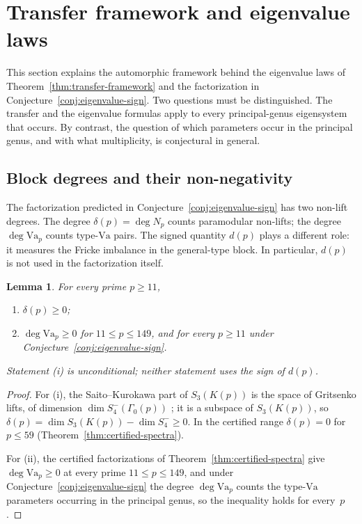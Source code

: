 \documentclass[11pt]{amsart}
\theoremstyle{plain}
\newtheorem{lemma}[theorem]{Lemma}
\theoremstyle{definition}
\newcommand{\Va}{\mathrm{Va}}
\providecommand{\Va}{\mathrm{Va}}
\begin{document}
	\section{Transfer framework and eigenvalue laws}
	\label{sec:transfer}
	
	This section explains the automorphic framework behind the eigenvalue laws
	of Theorem~\ref{thm:transfer-framework} and the factorization in
	Conjecture~\ref{conj:eigenvalue-sign}. Two questions must be
	distinguished. The transfer and the eigenvalue formulas apply to every
	principal-genus eigensystem that occurs. By contrast, the question of
	which parameters occur in the principal genus, and with what
	multiplicity, is conjectural in general.
	
	\subsection{Block degrees and their non-negativity}
	\label{ss:block-degrees}
	
	The factorization predicted in
	Conjecture~\ref{conj:eigenvalue-sign} has two non-lift degrees. The degree
	$\delta(p)=\deg N_p$ counts paramodular non-lifts; the degree
	$\deg\Va_p$ counts type-$\Va$ pairs. The signed quantity $d(p)$ plays a
	different role: it measures the Fricke imbalance in the general-type
	block. In particular, $d(p)$ is not used in the factorization itself.
	
	\begin{lemma}\label{lem:positivity}
		For every prime $p\ge11$,
		\begin{enumerate}[label=\textup{(\roman*)},leftmargin=2.3em]
			\item $\delta(p)\ge0$;
			\item $\deg\Va_p\ge0$ for $11\le p\le149$, and for every $p\ge11$
			under Conjecture~\ref{conj:eigenvalue-sign}.
		\end{enumerate}
		Statement \textup{(i)} is unconditional; neither statement uses the
		sign of $d(p)$.
	\end{lemma}
	
	\begin{proof}
		For \textup{(i)}, the Saito--Kurokawa part of $S_3(K(p))$ is the space
		of Gritsenko lifts, of dimension $\dim S_4^{-}(\Gamma_0(p))$
		\cite{Gritsenko1995,IPY2013}; it is a subspace of $S_3(K(p))$, so
		$\delta(p)=\dim S_3(K(p))-\dim S_4^{-}\ge0$. In the certified range
		$\delta(p)=0$ for $p\le59$ (Theorem~\ref{thm:certified-spectra}).
		
		For \textup{(ii)}, the certified factorizations of
		Theorem~\ref{thm:certified-spectra} give $\deg\Va_p\ge0$ at every
		prime $11\le p\le149$, and under
		Conjecture~\ref{conj:eigenvalue-sign} the degree $\deg\Va_p$ counts
		the type-$\Va$ parameters occurring in the principal genus, so the
		inequality holds for every~$p$.
	\end{proof}
	
\end{document}
